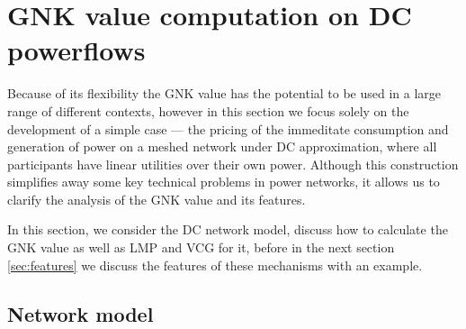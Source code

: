 

\section{GNK value computation on DC powerflows}\label{more_involved}

Because of its flexibility the GNK value has the potential to be used in a large range of different contexts,
however in this section we focus solely on the development of a simple case --- the pricing of the immeditate consumption and generation of power on a meshed network under DC approximation, where all participants have linear utilities over their own power.
Although this construction simplifies away some key technical problems in power networks, it allows us to clarify the analysis of the GNK value and its features.

In this section, we consider the DC network model, discuss how to calculate the GNK value as well as LMP and VCG for it, before in the next section \ref{sec:features} we discuss the features of these mechanisms with an example.

\subsection{Network model}\label{sec:the_setup}


